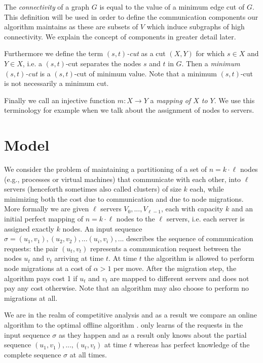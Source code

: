 \documentclass[a4paper,UKenglish,cleveref, autoref, thm-restate,authorcolumns]{lipics-v2019}
\newcommand{\opt}{\text{O{\scriptsize PT}}}
\newcommand{\onl}{\text{O{\scriptsize NL}}}
\begin{document}
The \textit{connectivity} of a graph $G$ is equal to the value of a minimum edge cut of $G$. This definition will be used in order to define the communication components our algorithm maintains as these are subsets of $V$ which induce subgraphs of high connectivity. We explain the concept of components in greater detail later.

Furthermore we define the term $(s,t)$\textit{-cut} as a cut $(X,Y)$ for which $s\in X$ and $Y\in X$, i.e. a $(s,t)$-cut separates the nodes $s$ and $t$ in $G$. Then a \textit{minimum $(s,t)$-cut} is a $(s,t)$-cut of minimum value. Note that a minimum $(s,t)$-cut is not necessarily a minimum cut.

Finally we call an injective function $m:X\rightarrow Y$ a \textit{mapping of $X$ to $Y$}. We use this terminology for example when we talk about the assignment of nodes to servers.

\sloppy

\section{Model}
\label{problem_definition_section}

We consider the problem of maintaining a partitioning of a 
set of $n=k\cdot \ell$ nodes (e.g., processes or virtual machines) 
that communicate with each other, 
into $\ell$ servers (henceforth sometimes also called clusters) of size $k$ each, 
while minimizing both the cost due to communication and due to node migrations. 
More formally we are given $\ell$ servers $V_0,...,V_{\ell-1}$, 
each with capacity $k$ and an initial perfect mapping of $n=k\cdot \ell$ nodes to the $\ell$ servers, 
i.e. each server is assigned exactly $k$ nodes. An input sequence $\sigma=(u_1, v_1), (u_2, v_2),...(u_i,v_i),...$ describes 
the sequence of communication requests: the pair $(u_t, v_t)$ represents a communication request between the nodes 
$u_t$ and $v_t$ arriving at time $t$. At time $t$ the algorithm is allowed to perform node migrations at a cost of $\alpha>1$ per move. 
After the migration step, the algorithm pays cost 1 if $u_t$ and $v_t$ are mapped to different servers and does not pay any cost otherwise. Note that an algorithm may also choose to perform no migrations at all.

We are in the realm of competitive analysis and as a result we compare an online algorithm \onl{} to the optimal offline algorithm \opt{}. \onl{} only learns of the requests in the input sequence $\sigma$ as they happen and as a result only knows about the partial sequence $(u_1,v_1),...,(u_t,v_t)$ at time $t$ whereas \opt{} has perfect knowledge of the complete sequence $\sigma$ at all times.
\end{document}
